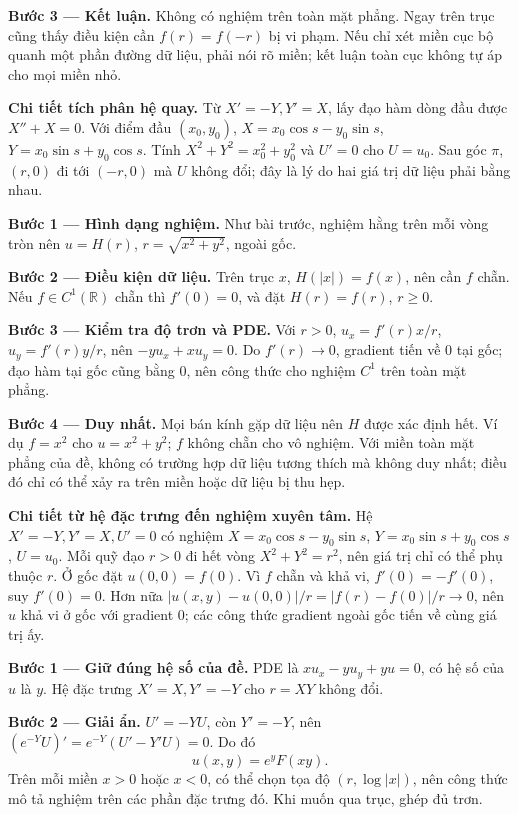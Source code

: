 \textbf{Bước 3 — Kết luận.} Không có nghiệm trên toàn mặt phẳng. Ngay trên trục cũng thấy điều kiện cần $f(r)=f(-r)$ bị vi phạm. Nếu chỉ xét miền cục bộ quanh một phần đường dữ liệu, phải nói rõ miền; kết luận toàn cục không tự áp cho mọi miền nhỏ.

\textbf{Chi tiết tích phân hệ quay.} Từ $X'=-Y,Y'=X$, lấy đạo hàm dòng đầu được $X''+X=0$. Với điểm đầu $(x_0,y_0)$, $X=x_0\cos s-y_0\sin s$, $Y=x_0\sin s+y_0\cos s$. Tính $X^2+Y^2=x_0^2+y_0^2$ và $U'=0$ cho $U=u_0$. Sau góc $\pi$, $(r,0)$ đi tới $(-r,0)$ mà $U$ không đổi; đây là lý do hai giá trị dữ liệu phải bằng nhau.

\textbf{Bước 1 — Hình dạng nghiệm.} Như bài trước, nghiệm hằng trên mỗi vòng tròn nên $u=H(r)$, $r=\sqrt{x^2+y^2}$, ngoài gốc.

\textbf{Bước 2 — Điều kiện dữ liệu.} Trên trục $x$, $H(|x|)=f(x)$, nên cần $f$ chẵn. Nếu $f\in C^1(\mathbb R)$ chẵn thì $f'(0)=0$, và đặt $H(r)=f(r)$, $r\ge0$.

\textbf{Bước 3 — Kiểm tra độ trơn và PDE.} Với $r>0$, $u_x=f'(r)x/r$, $u_y=f'(r)y/r$, nên $-yu_x+xu_y=0$. Do $f'(r)\to0$, gradient tiến về 0 tại gốc; đạo hàm tại gốc cũng bằng 0, nên công thức cho nghiệm $C^1$ trên toàn mặt phẳng.

\textbf{Bước 4 — Duy nhất.} Mọi bán kính gặp dữ liệu nên $H$ được xác định hết. Ví dụ $f=x^2$ cho $u=x^2+y^2$; $f$ không chẵn cho vô nghiệm. Với miền toàn mặt phẳng của đề, không có trường hợp dữ liệu tương thích mà không duy nhất; điều đó chỉ có thể xảy ra trên miền hoặc dữ liệu bị thu hẹp.

\textbf{Chi tiết từ hệ đặc trưng đến nghiệm xuyên tâm.} Hệ $X'=-Y,Y'=X,U'=0$ có nghiệm $X=x_0\cos s-y_0\sin s$, $Y=x_0\sin s+y_0\cos s$, $U=u_0$. Mỗi quỹ đạo $r>0$ đi hết vòng $X^2+Y^2=r^2$, nên giá trị chỉ có thể phụ thuộc $r$. Ở gốc đặt $u(0,0)=f(0)$. Vì $f$ chẵn và khả vi, $f'(0)=-f'(0)$, suy $f'(0)=0$. Hơn nữa $|u(x,y)-u(0,0)|/r=|f(r)-f(0)|/r\to0$, nên $u$ khả vi ở gốc với gradient $0$; các công thức gradient ngoài gốc tiến về cùng giá trị ấy.

\textbf{Bước 1 — Giữ đúng hệ số của đề.} PDE là $xu_x-yu_y+yu=0$, có hệ số của $u$ là $y$. Hệ đặc trưng $X'=X,Y'=-Y$ cho $r=XY$ không đổi.

\textbf{Bước 2 — Giải ẩn.} $U'=-YU$, còn $Y'=-Y$, nên $(e^{-Y}U)'=e^{-Y}(U'-Y'U)=0$. Do đó
\[u(x,y)=e^yF(xy).\]
Trên mỗi miền $x>0$ hoặc $x<0$, có thể chọn tọa độ $(r,\log|x|)$, nên công thức mô tả nghiệm trên các phần đặc trưng đó. Khi muốn qua trục, ghép đủ trơn.

